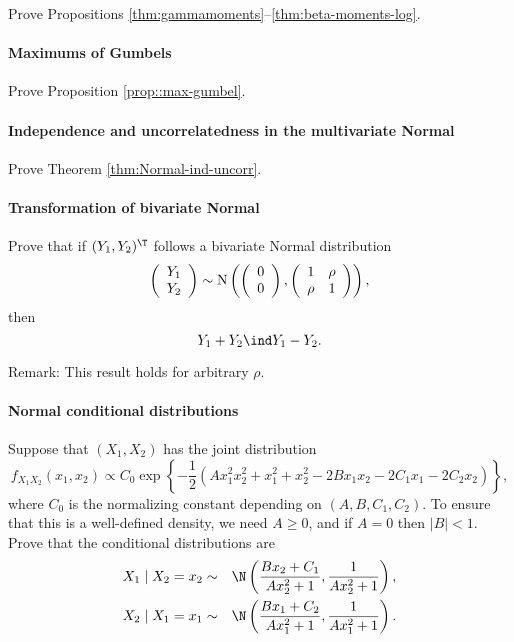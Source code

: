 Prove Propositions \ref{thm:gammamoments}--\ref{thm:beta-moments-log}.



\paragraph{Maximums of Gumbels}\label{hwmath2::max-gumbel}

Prove Proposition \ref{prop::max-gumbel}. 




\paragraph{Independence and uncorrelatedness in the multivariate Normal}\label{hwmath2::independence-uncorr-normal}

Prove Theorem \ref{thm:Normal-ind-uncorr}. 

\paragraph{Transformation of bivariate Normal}


Prove that if $(Y_{1},Y_{2})^{\T}$ follows
a bivariate Normal distribution
\[
\left(\begin{array}{c}
Y_{1}\\
Y_{2}
\end{array}\right)\sim\textup{N}\left(\left(\begin{array}{c}
0\\
0
\end{array}\right),\left(\begin{array}{cc}
1 & \rho\\
\rho & 1
\end{array}\right)\right),
\]
then 
$$
Y_{1}+Y_{2}\ind Y_{1}-Y_{2}.
$$



Remark: This result holds for arbitrary $\rho$. 


\paragraph{Normal conditional distributions}\label{hwmath2::normal-conditionals}


Suppose that $(X_1, X_2)$ has the joint distribution
$$
f_{X_1X_2}\left(x_{1}, x_{2}\right) \propto C_0 \exp \left\{  -\frac{1}{2}\left( A x_{1}^{2} x_{2}^{2}+x_{1}^{2}+x_{2}^{2} -2 B x_{1} x_{2}-2 C_{1} x_{1}-2 C_{2} x_{2} \right) \right\},
$$
where $C_0$ is the normalizing constant depending on $(A,B,C_1, C_2)$. To ensure that this is a well-defined density, we need $A \geq 0$, and if $A=0$ then $|B| < 1$. Prove that the conditional distributions are
\begin{eqnarray*}
X_{1} \mid X_2 =  x_{2}  &\sim& \N\left(\frac{B x_{2}+C_{1}}{A x_{2}^{2}+1}, \frac{1}{A x_{2}^{2}+1}\right) , \\
X_{2} \mid X_1 =  x_{1}  &\sim& \N\left(\frac{B x_{1}+C_{2}}{A x_{1}^{2}+1}, \frac{1}{A x_{1}^{2}+1}\right).
\end{eqnarray*}


